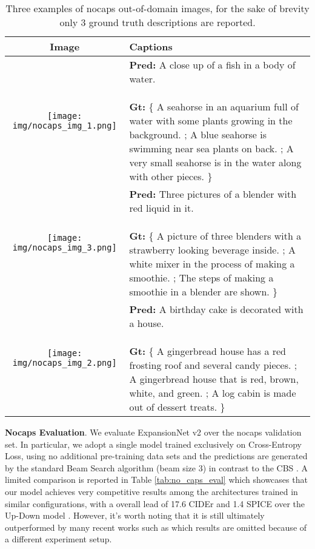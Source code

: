 \begin{table}[ht!]
 \centering
 \scriptsize
 \caption{Three examples of nocaps out-of-domain images, for the sake of brevity only 3 ground truth descriptions are reported.}
 \begin{tabular}{  @{}c@{} | >{\RaggedRight\arraybackslash}p{4.5cm}  }
 Image & Captions \\
 \hline
 \texttt{[image: img/nocaps\_img\_1.png]}
& \vspace{-1.5cm}{\textbf{Pred:} A close up of a fish in a body of water.
\leavevmode\newline \leavevmode\newline
\textbf{Gt:} \{ A seahorse in an aquarium full of water with some plants growing in the background. ; A blue seahorse is swimming near sea plants on back. ; A very small seahorse is in the water along with other pieces. \} } \\

\hline
 \texttt{[image: img/nocaps\_img\_3.png]}
& \vspace{-1.5cm}{\textbf{Pred:} Three pictures of a blender with red liquid in it.
\leavevmode\newline \leavevmode\newline
\textbf{Gt:} \{ A picture of three blenders with a strawberry looking beverage inside. ; A white mixer in the process of making a smoothie. ; The steps of making a smoothie in a blender are shown. \} } \\

\hline
 \texttt{[image: img/nocaps\_img\_2.png]}
& \vspace{-1.5cm}{\textbf{Pred:} 
A birthday cake is decorated with a house.
\leavevmode\newline \leavevmode\newline
\textbf{Gt:} \{ A gingerbread house has a red frosting roof and several candy pieces. ; A gingerbread house that is red, brown, white, and green. ; A log cabin is made out of dessert treats.  \} } \\
\hline
\end{tabular}
\label{nocaps_img}
\end{table}

\medskip
\noindent
\textbf{Nocaps Evaluation}. We evaluate ExpansionNet v2 over the nocaps validation set. In particular, we adopt a single model trained exclusively on Cross-Entropy Loss, using no additional pre-training data sets and the predictions are generated by the standard Beam Search algorithm (beam size 3) in contrast to the CBS \cite{anderson2016guided}. A limited comparison is reported in Table \ref{tab:no_caps_eval} which showcases that our model achieves very competitive results among the architectures trained in similar configurations, with a overall lead of 17.6 CIDEr and 1.4 SPICE over the Up-Down model \cite{anderson2018bottom}. However, it's worth noting that it is still ultimately outperformed by many recent works such as \cite{hu2022scaling, zhang2021vinvl, li2022blip, li2020oscar} which results are omitted because of a different experiment setup.


